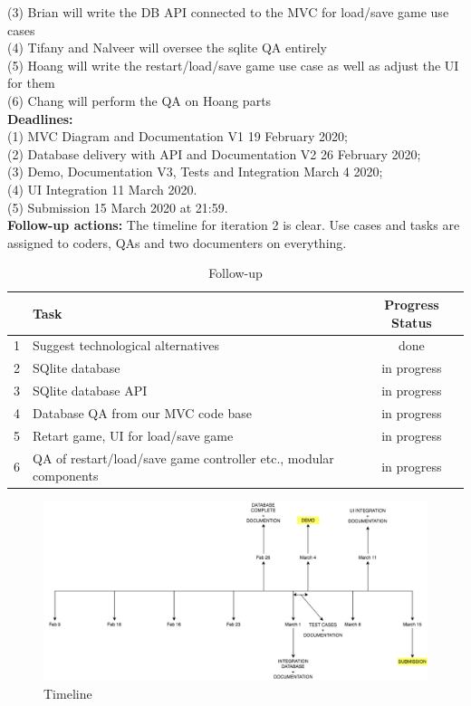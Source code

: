 \documentclass[12pt]{article}
\begin{document}
(3) Brian will write the DB API connected to the MVC for load/save game use cases\\
(4) Tifany and Nalveer will oversee the sqlite QA entirely\\
(5) Hoang will write the restart/load/save game use case as well as adjust the UI for them\\
(6) Chang will perform the QA on Hoang parts\\
{\bf Deadlines:} \\
(1) MVC Diagram and Documentation V1 19 February 2020;\\
(2) Database delivery with API and Documentation V2 26 February 2020;\\
(3) Demo, Documentation V3, Tests and Integration March 4 2020; \\
(4) UI Integration 11 March 2020. \\
(5) Submission 15 March 2020 at 21:59. \\
{\bf Follow-up actions:} The timeline for iteration 2 is clear. Use cases and tasks are assigned to coders, QAs and two documenters on everything.\\

\begin{table}[h!]
\centering
 \begin{tabular}{||l l c ||} 
 \hline
   & Task & Progress Status\\ [0.5ex] 
 \hline\hline
 1 & Suggest technological alternatives & done \\
 2 & SQlite database & in progress\\
 3 & SQlite database API & in progress\\
 4 & Database QA from our MVC code base & in progress\\
 5 & Retart game, UI for load/save game & in progress\\
 6 & QA of restart/load/save game controller etc., modular components & in progress\\[1ex] 
 \hline
 \end{tabular}
\caption{Follow-up }
\label{table:1}
\end{table}

\newpage

\begin{figure}[htbp]
    \centering
    \includegraphics[scale=0.5]{timeline.png}
    \caption{Timeline}
    \label{fig:UI-1}
\end{figure}
\end{document}
